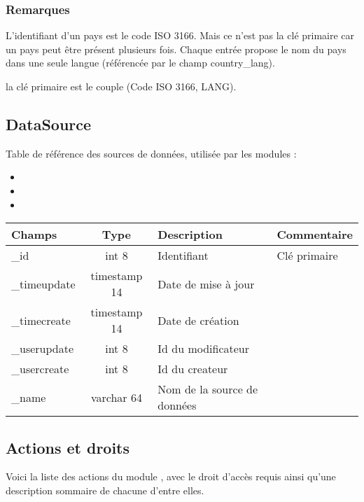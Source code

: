 \subsubsection{Remarques}

L'identifiant d'un pays est le code ISO 3166. Mais ce n'est pas la clé primaire car un pays peut être présent plusieurs fois. Chaque entrée propose le nom du pays dans une seule langue (référencée par le champ country\_lang).

la clé primaire est le couple (Code ISO 3166, LANG).


\subsection{DataSource}

Table de référence des sources de données, utilisée par les modules :
\begin{itemize}
 \item \company
 \item \contact
 \item 
\end{itemize}
\vspace{0.4cm}

\begin{tabular}{|p{3cm}|c|p{5.4cm}|p{2.6cm}|}
\hline
\textbf{Champs} & \textbf{Type} & \textbf{Description} & \textbf{Commentaire} \\
\hline
\_id & int 8 & Identifiant & Clé primaire \\
\hline
\_timeupdate & timestamp 14 & Date de mise à jour & \\
\hline
\_timecreate & timestamp 14 & Date de création & \\
\hline
\_userupdate & int 8 & Id du modificateur & \\
\hline
\_usercreate & int 8 & Id du createur & \\
\hline
\_name & varchar 64 & Nom de la source de données & \\
\hline
\end{tabular}


\subsection{Actions et droits}

Voici la liste des actions du module \project, avec le droit d'accès requis ainsi qu'une description sommaire de chacune d'entre elles.\\

